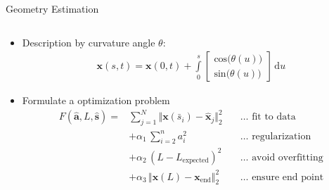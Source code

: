 \documentclass[
xcolor=dvipsnames,
aspectratio=169,
9pt,
]{beamer}
\begin{document}
\begin{frame}{Geometry Estimation}

\begin{columns}
	\begin{column}{.6\textwidth}
		\begin{itemize}
			\item Description by curvature angle $\theta$:
			\begin{equation*}
			\begin{array}{lll}
			\textbf{x}(s,t) =\textbf{x}(0,t)+ \displaystyle\int\limits_0^s
			\left[
			\begin{array}{ll}
			\mathrm{cos}\big(\theta(u)\big) \\
			\mathrm{sin}\big(\theta(u)\big)
			\end{array}
			\right]
			\,\mathrm{d}u
			\end{array}
			\end{equation*}
			\item Formulate a optimization problem
			  \begin{equation*}
			\begin{array}{lll}
			F(\hat{\textbf{a}},L,\hat{\textbf{s}}) =& \sum\limits_{j=1}^{N} \Vert \textbf{x}(\bar{s}_i) - \hat{\textbf{x}}_j \Vert_2^2   \quad &\ldots\text{ fit to data}\\[4mm]
			&+ \alpha_1\, \sum\limits_{i=2}^{n} a_i^2     \quad &\ldots\text{ regularization}\\[4mm]
			&+ \alpha_2\, (L - L_\text{expected})^2         \quad &\ldots\text{ avoid overfitting}\\[4mm]
			&+ \alpha_3\, \Vert \textbf{x}(L) - \textbf{x}_\text{end}\Vert_2^2    \quad &\ldots\text{ ensure end point}\\[4mm]
			\end{array}
			\end{equation*} 
			
		\end{itemize}
	\end{column}


\end{columns}
\end{frame}
\end{document}

